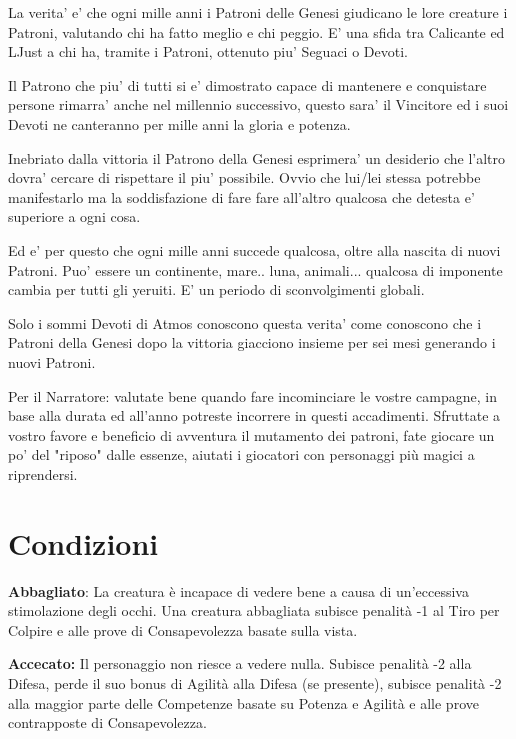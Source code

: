 \documentclass[a4paper,11pt,twoside,openany]{book}
\begin{document}
{La verita' e' che ogni mille anni i Patroni delle Genesi giudicano le lore creature i Patroni, valutando chi ha fatto meglio e chi peggio. E' una sfida tra Calicante ed LJust a chi ha, tramite i Patroni, ottenuto piu' Seguaci o Devoti.

Il Patrono che piu' di tutti si e' dimostrato capace di mantenere e conquistare persone rimarra' anche nel millennio successivo, questo sara' il Vincitore ed i suoi Devoti ne canteranno per mille anni la gloria e potenza.

Inebriato dalla vittoria il Patrono della Genesi esprimera' un desiderio che l'altro dovra' cercare di rispettare il piu' possibile. Ovvio che lui/lei stessa potrebbe manifestarlo ma la soddisfazione di fare fare all'altro qualcosa che detesta e' superiore a ogni cosa.

Ed e' per questo che ogni mille anni succede qualcosa, oltre alla nascita di nuovi Patroni. Puo' essere un continente, mare.. luna, animali... qualcosa di imponente cambia per tutti gli yeruiti. E' un periodo di sconvolgimenti globali.

Solo i sommi Devoti di Atmos conoscono questa verita' come conoscono che i Patroni della Genesi dopo la vittoria giacciono insieme per sei mesi generando i nuovi Patroni.

\bigskip

Per il Narratore: valutate bene quando fare incominciare le vostre campagne, in base alla durata ed all'anno potreste incorrere in questi accadimenti.
Sfruttate a vostro favore e beneficio di avventura il mutamento dei patroni, fate giocare un po' del "riposo" dalle essenze, aiutati i giocatori con personaggi più magici a riprendersi.

\pagebreak

\section{Condizioni}

\label{condizioni}

\textbf{Abbagliato}: La creatura è incapace di vedere bene a causa di un'eccessiva stimolazione degli occhi. Una creatura abbagliata subisce penalità -1 al Tiro per Colpire e alle prove di Consapevolezza basate sulla vista.

\textbf{Accecato:} Il personaggio non riesce a vedere nulla. Subisce penalità -2 alla Difesa, perde il suo bonus di Agilità alla Difesa (se presente), subisce penalità -2 alla maggior parte delle Competenze basate su Potenza e Agilità e alle prove contrapposte di Consapevolezza.

}
\end{document}
